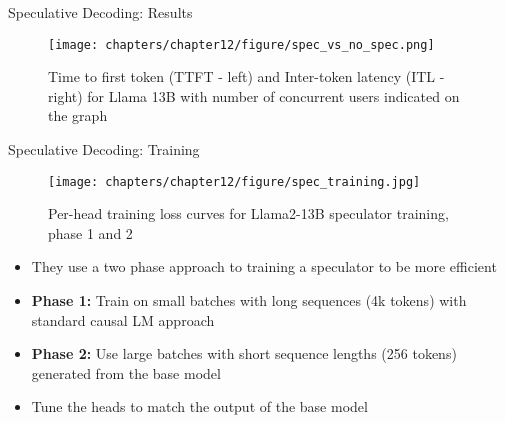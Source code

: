\begin{vbframe}{Speculative Decoding: Results}

\vfill

\begin{figure}
    \centering
    \texttt{[image: chapters/chapter12/figure/spec\_vs\_no\_spec.png]}
    \caption{Time to first token (TTFT - left) and Inter-token latency (ITL - right) for Llama 13B with number of concurrent users indicated on the graph }
\end{figure}

\vfill

\end{vbframe}


\begin{vbframe}{Speculative Decoding: Training}

\begin{figure}
    \centering
    \texttt{[image: chapters/chapter12/figure/spec\_training.jpg]}
    \caption{Per-head training loss curves for Llama2-13B speculator training, phase 1 and 2 }
\end{figure}

\begin{itemize}
    \item They use a two phase approach to training a speculator to be more efficient
    \item \textbf{Phase 1:} Train on small batches with long sequences (4k tokens) with standard causal LM approach
    \item \textbf{Phase 2:} Use large batches with short sequence lengths (256 tokens) generated from the base model 
    \item Tune the heads to match the output of the base model
\end{itemize}
    
\end{vbframe}


